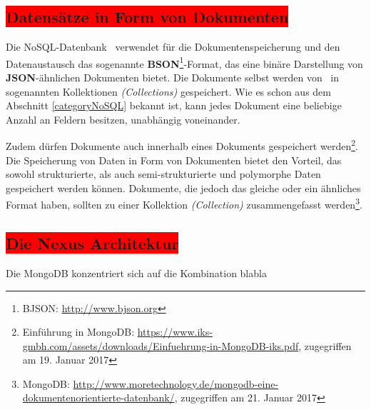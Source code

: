 \subsection{\colorbox{red}{Datensätze in Form von Dokumenten}}
Die NoSQL-Datenbank \mongo\ verwendet für die Dokumentenspeicherung und den Datenaustausch das sogenannte \textbf{BSON}\footnote{BJSON: \url{http://www.bjson.org}}-Format, das eine binäre Darstellung von \textbf{JSON}-ähnlichen Dokumenten bietet.
Die Dokumente selbst werden von \mongo\ in sogenannten Kollektionen \textit{(Collections)} gespeichert. Wie es schon aus dem Abschnitt \ref{categoryNoSQL} bekannt ist, kann jedes Dokument eine beliebige Anzahl an Feldern besitzen, unabhängig voneinander. 

Zudem dürfen Dokumente auch innerhalb eines Dokuments gespeichert werden\footnote{Einführung in MongoDB: \url{https://www.iks-gmbh.com/assets/downloads/Einfuehrung-in-MongoDB-iks.pdf}, zugegriffen am 19. Januar 2017}. Die Speicherung von Daten in Form von Dokumenten bietet den Vorteil, das sowohl strukturierte, als auch semi-strukturierte und polymorphe Daten gespeichert werden können. Dokumente, die jedoch das gleiche oder ein ähnliches Format haben, sollten zu einer Kollektion \textit{(Collection)} zusammengefasst werden\footnote{MongoDB: \url{http://www.moretechnology.de/mongodb-eine-dokumentenorientierte-datenbank/}, zugegriffen am 21. Januar 2017}.

\subsection{\colorbox{red}{Die Nexus Architektur}}

Die MongoDB konzentriert sich auf die Kombination blabla


